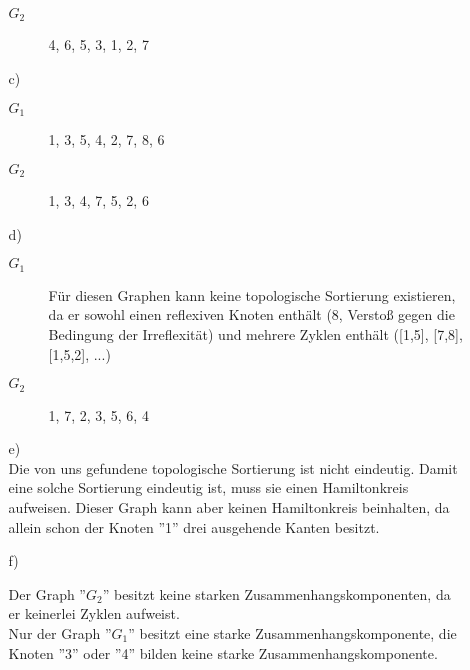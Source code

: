 \documentclass[a4paper,11pt,ngerman]{scrartcl}
\begin{document}
\begin{enumerate}
\begin{enumerate}
\begin{description}
				\item[$G_2$] 4, 6, 5, 3, 1, 2, 7
			\end{description}
			\item[c)]\quad
			\begin{description}
				\item[$G_1$] 1, 3, 5, 4, 2, 7, 8, 6
				\item[$G_2$] 1, 3, 4, 7, 5, 2, 6
			\end{description}
			\item[d)]\quad
			\begin{description}
				\item[$G_1$] Für diesen Graphen kann keine topologische Sortierung existieren, da er sowohl einen reflexiven Knoten enthält (8, Verstoß gegen die Bedingung der Irreflexität) und mehrere Zyklen enthält ([1,5], [7,8], [1,5,2], ...)
				\item[$G_2$] 1, 7, 2, 3, 5, 6, 4
			\end{description}
			\item[e)]\quad \\
				Die von uns gefundene topologische Sortierung ist nicht eindeutig. Damit eine solche Sortierung eindeutig ist, muss sie einen Hamiltonkreis aufweisen. Dieser Graph kann aber keinen Hamiltonkreis beinhalten, da allein schon der Knoten ''1'' drei ausgehende Kanten besitzt.
			\item[f)]\quad
				\begin{multicols}{2}
					Der Graph ''$G_2$'' besitzt keine starken Zusammenhangskomponenten, da er keinerlei Zyklen aufweist. \\
					Nur der Graph ''$G_1$'' besitzt eine starke Zusammenhangskomponente, die Knoten ''3'' oder ''4'' bilden keine starke Zusammenhangskomponente. \\
\end{multicols}
\end{enumerate}
\end{enumerate}
\end{document}

